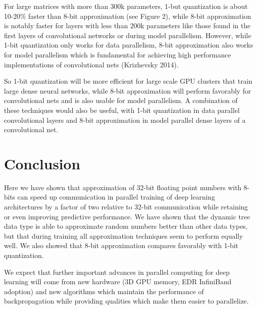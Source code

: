 \documentclass{article} %
\begin{document}
For large matrices with more than 300k parameters, 1-but quantization is about 10-20\% faster than 8-bit approximation (see Figure 2), while 8-bit approximation is notably faster for layers with less than 200k parameters like those found in the first layers of convolutional networks or during model parallelism. However, while 1-bit quantization only works for data parallelism, 8-bit approximation also works for model parallelism which is fundamental for achieving high performance implementations of convolutional nets (Krizhevsky 2014). 

So 1-bit quantization will be more efficient for large scale GPU clusters that train large dense neural networks, while 8-bit approximation will perform favorably for convolutional nets and is also usable for model parallelism. A combination of these techniques would also be useful, with 1-bit quantization in data parallel convolutional layers and 8-bit approximation in model parallel dense layers of a convolutional net. 

\section*{Conclusion}

Here we have shown that approximation of 32-bit floating point numbers with 8-bits can speed up communication in parallel training of deep learning architectures by a factor of two relative to 32-bit communication while retaining or even improving predictive performance. We have shown that the dynamic tree data type is able to approximate random numbers better than other data types, but that during training all approximation techniques seem to perform equally well. We also showed that 8-bit approximation compares favorably with 1-bit quantization.

We expect that further important advances in parallel computing for deep learning will come from new hardware (3D GPU memory, EDR InfiniBand adoption) and new algorithms which maintain the performance of backpropagation while providing qualities which make them easier to parallelize. 



\end{document}
